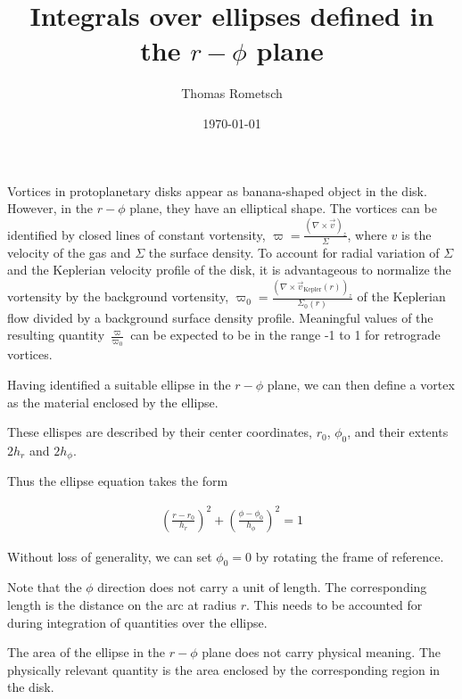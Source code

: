 \documentclass[a4paper]{scrartcl}
\begin{document}
\title{Integrals over ellipses defined in the $r-\phi$ plane}

\author{Thomas Rometsch}

\date{\today}

\maketitle
%



Vortices in protoplanetary disks appear as banana-shaped object in the disk.
However, in the $r-\phi$ plane, they have an elliptical shape.
The vortices can be identified by closed lines of constant vortensity, 
$\varpi = \frac{(\nabla \times \vec{v})_z}{\Sigma}$,
where $v$ is the velocity of the gas and $\Sigma$ the surface density.
To account for radial variation of $\Sigma$ and the Keplerian velocity profile of the disk,
it is advantageous to normalize the vortensity by the background vortensity, 
$\varpi_0 = \frac{(\nabla \times \vec{v}_\mathrm{Kepler}(r))_z}{\Sigma_0(r)}$
of the Keplerian flow divided by a background surface density profile.
Meaningful values of the resulting quantity $\frac{\varpi}{\varpi_0}$ can be expected to be in the range -1 to 1
for retrograde vortices.

Having identified a suitable ellipse in the $r-\phi$ plane, 
we can then define a vortex as the material enclosed by the ellipse.

These ellispes are described by their center coordinates, $r_0$, $\phi_0$, and their extents
$2h_r$ and $2h_\phi$.

Thus the ellipse equation takes the form

\begin{align}\label{eqn:ellipse_equation}
  \left( \frac{r - r_0}{h_r} \right)^2 + \left( \frac{\phi - \phi_0}{h_\phi} \right)^2 = 1
\end{align}

Without loss of generality, we can set $\phi_0 = 0$ by rotating the frame of reference.

Note that the $\phi$ direction does not carry a unit of length.
The corresponding length is the distance on the arc at radius $r$.
This needs to be accounted for during integration of quantities over the ellipse.

The area of the ellipse in the $r-\phi$ plane does not carry physical meaning.
The physically relevant quantity is the area enclosed by the corresponding region in the disk.
\end{document}
